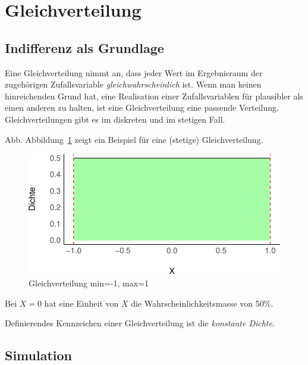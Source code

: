 \documentclass[
  a4paper,
  DIV=11]{scrreprt}
\theoremstyle{definition}
\theoremstyle{remark}
\begin{document}
\hypertarget{gleichverteilung}{%
\section{Gleichverteilung}\label{gleichverteilung}}

\hypertarget{indifferenz-als-grundlage}{%
\subsection{Indifferenz als Grundlage}\label{indifferenz-als-grundlage}}

Eine Gleichverteilung nimmt an, dass jeder Wert im Ergebnisraum der
zugehörigen Zufallsvariable \emph{gleichwahrscheinlich} ist. Wenn man
keinen hinreichenden Grund hat, eine Realisation einer Zufallsvariablen
für plausibler als einen anderen zu halten, ist eine Gleichverteilung
eine passende Verteilung. Gleichverteilungen gibt es im diskreten und im
stetigen Fall.

Abb. Abbildung~\ref{fig-uniform} zeigt ein Beispiel für eine (stetige)
Gleichverteilung.

\begin{figure}

{\centering \includegraphics{./Verteilungen_files/figure-pdf/fig-uniform-1.pdf}

}

\caption{\label{fig-uniform}Gleichverteilung min=-1, max=1}

\end{figure}

Bei \(X=0\) hat eine Einheit von \(X\) die Wahrscheinlichkeitsmasse von
50\%.

Definierendes Kennzeichen einer Gleichverteilung ist die \emph{konstante
Dichte}.

\hypertarget{simulation}{%
\subsection{Simulation}\label{simulation}}
\end{document}
